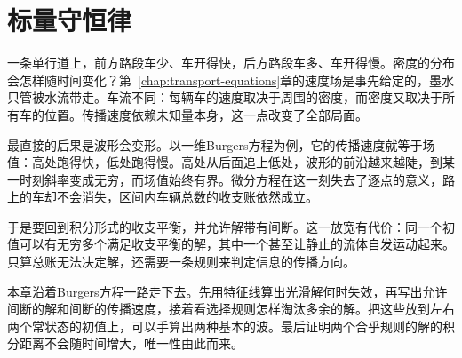 \chapter{标量守恒律}
\label{chap:scalar-conservation-laws}

一条单行道上，前方路段车少、车开得快，后方路段车多、车开得慢。密度的分布会怎样随时间变化？第~\ref{chap:transport-equations}章的速度场是事先给定的，墨水只管被水流带走。车流不同：每辆车的速度取决于周围的密度，而密度又取决于所有车的位置。传播速度依赖未知量本身，这一点改变了全部局面。

最直接的后果是波形会变形。以一维Burgers方程为例，它的传播速度就等于场值：高处跑得快，低处跑得慢。高处从后面追上低处，波形的前沿越来越陡，到某一时刻斜率变成无穷，而场值始终有界。微分方程在这一刻失去了逐点的意义，路上的车却不会消失，区间内车辆总数的收支账依然成立。

于是要回到积分形式的收支平衡，并允许解带有间断。这一放宽有代价：同一个初值可以有无穷多个满足收支平衡的解，其中一个甚至让静止的流体自发运动起来。只算总账无法决定解，还需要一条规则来判定信息的传播方向。

本章沿着Burgers方程一路走下去。先用特征线算出光滑解何时失效，再写出允许间断的解和间断的传播速度，接着看选择规则怎样淘汰多余的解。把这些放到左右两个常状态的初值上，可以手算出两种基本的波。最后证明两个合乎规则的解的积分距离不会随时间增大，唯一性由此而来。














